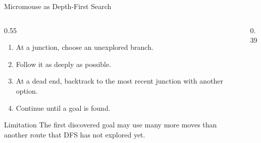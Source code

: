 \documentclass[aspectratio=169,10pt]{beamer}
\begin{document}
\begin{frame}[shrink=20]{Micromouse as Depth-First Search}
  \begin{columns}[T,onlytextwidth]
    \begin{column}{0.55\textwidth}
      \begin{enumerate}
        \item At a junction, choose an unexplored branch.
        \item Follow it as deeply as possible.
        \item At a dead end, backtrack to the most recent junction with another option.
        \item Continue until a goal is found.
      \end{enumerate}

      \begin{alertblock}{Limitation}
        The first discovered goal may use many more moves than another route that DFS has not explored yet.
      \end{alertblock}
    \end{column}

    \begin{column}{0.39\textwidth}
    \end{column}
  \end{columns}

\end{frame}
\end{document}
